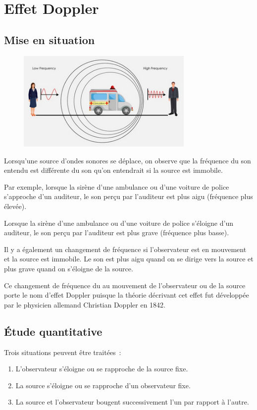 
\section{Effet Doppler}
\label{effet-doppler}

\subsection{Mise en situation}

\begin{figure}
\centering
\includegraphics[width=8.557cm,height=4.856cm]{Pictures/1000000100000162000000C9EFEF725F14698266.png}
\caption{}
\end{figure}

Lorsqu'une source d'ondes sonores se déplace, on observe que la
fréquence du son entendu est différente du son qu'on entendrait si la
source est immobile.

Par exemple, lorsque la sirène d'une ambulance ou d'une voiture de
police s'approche d'un auditeur, le son perçu par l'auditeur est plus
aigu (fréquence plus élevée).

Lorsque la sirène d'une ambulance ou d'une voiture de police s'éloigne
d'un auditeur, le son perçu par l'auditeur est plus grave (fréquence
plus basse).

Il y a également un changement de fréquence si l'observateur est en
mouvement et la source est immobile. Le son est plus aigu quand on se
dirige vers la source et plus grave quand on s'éloigne de la source.

Ce changement de fréquence du au mouvement de l'observateur ou de la
source porte le nom d'effet Doppler puisque la théorie décrivant cet
effet fut développée par le physicien allemand Christian Doppler en
1842.

\subsection{Étude quantitative}

Trois situations peuvent être traitées~:
\begin{enumerate}
	\item L'observateur s'éloigne ou se rapproche de la source fixe.
	\item La source s'éloigne ou se rapproche d'un observateur fixe.
	\item La source et l'observateur bougent successivement l'un par rapport à l'autre.
\end{enumerate}

